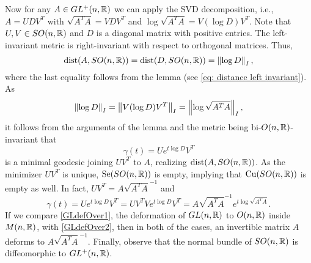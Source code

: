 \hf Now for any $A\in GL^+(n,\mathbb{R})$ we can apply the SVD decomposition,  i.e., $A = UDV^T$ with $\sqrt{A^TA} = VDV^T$ and $\log\sqrt{A^TA} = V(\log D) V^T$. Note that $U,V\in SO(n,\mathbb{R})$ and $D$ is a diagonal matrix with positive entries. The left-invariant metric is right-invariant with respect to orthogonal matrices. Thus,
\begin{displaymath}
    \operatorname{dist}(A,SO(n,\mathbb{R})) = \operatorname{dist}(D,SO(n,\mathbb{R})) = \left\|\log D\right\|_I,
\end{displaymath}
where the last equality follows from the lemma (see \eqref{eq: distance left invariant}). As 
\begin{displaymath}
    \left\|\log D\right\|_I = \left\|V(\log D) V^T\right\|_I = \left\|\log\sqrt{A^TA}\right\|_I,
\end{displaymath}
it follows from the arguments of the lemma and the metric being bi-$O(n,\mathbb{R})$-invariant that
\begin{displaymath}
    \gamma(t)=Ue^{t \log D}V^T
\end{displaymath}
is a minimal geodesic joining $UV^T$ to $A$, realizing $\operatorname{dist}(A,SO(n,\mathbb{R}))$. As the minimizer $UV^T$ is unique, $\mathrm{Se}(SO(n,\mathbb{R}))$ is empty, implying that $\mathrm{Cu}(SO(n,\mathbb{R}))$ is empty as well. In fact, $UV^T=A\sqrt{A^T A}^{-1}$ and 
\begin{equation}\label{GLdefOver2}
    \gamma(t)=Ue^{t \log D}V^T=UV^T Ve^{t \log D}V^T=A\sqrt{A^T A}^{-1}e^{t\log \sqrt{A^T A}}.
\end{equation}
If we compare \eqref{GLdefOver1}, the deformation of $GL(n,\mathbb{R})$ to $O(n,\mathbb{R})$ inside $M(n,\mathbb{R})$, with \eqref{GLdefOver2}, then in both of the cases, an invertible matrix $A$ deforms to $A\sqrt{A^T A}^{-1}$. Finally, observe that the normal bundle of $SO(n,\mathbb{R})$ is diffeomorphic to $GL^+(n,\mathbb{R})$.
	

